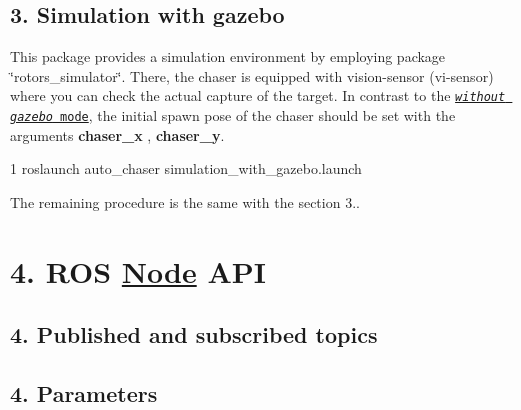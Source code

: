 \subsection*{3. Simulation with gazebo}

This package provides a simulation environment by employing package \char`\"{}rotors\+\_\+simulator\char`\"{}. There, the chaser is equipped with vision-\/sensor (vi-\/sensor) where you can check the actual capture of the target. In contrast to the \href{#without}{\tt {\itshape without gazebo} mode}, the initial spawn pose of the chaser should be set with the arguments {\bfseries chaser\+\_\+x} , {\bfseries chaser\+\_\+y}.


\begin{DoxyCode}
1 roslaunch auto\_chaser simulation\_with\_gazebo.launch
\end{DoxyCode}


The remaining procedure is the same with the section 3..

\section*{4. R\+OS \hyperlink{struct_node}{Node} A\+PI}

\subsection*{4. Published and subscribed topics}

\subsection*{4. Parameters}

\subsection*{}